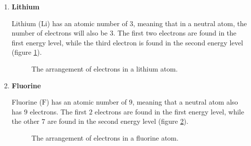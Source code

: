 \begin{enumerate}[noitemsep, label=\textbf{\arabic*}. ] 

\item{\textbf{Lithium} \\
\begin{minipage}{.4\textwidth}
Lithium ($\text{Li}$) has an atomic number of $3$, meaning that in a neutral atom, the number of electrons will also be $3$. The first two electrons are found in the first energy level, while the third electron is found in the second energy level (figure \ref{fig:atom:lithium}).
\end{minipage}
\begin{minipage}{.6\textwidth}
\begin{figure}[H]
\begin{center}
\caption{The arrangement of electrons in a lithium atom.}
\label{fig:atom:lithium}
\end{center}
\end{figure}
\end{minipage}
}

\item{\textbf{Fluorine} \\
\begin{minipage}{.4\textwidth}
Fluorine ($\text{F}$) has an atomic number of $9$, meaning that a neutral atom also has $9$ electrons. The first $2$ electrons are found in the first energy level, while the other $7$ are found in the second energy level (figure \ref{fig:atom:fluorine}).
\end{minipage}
\begin{minipage}{.6\textwidth}
\begin{figure}[H]
\begin{center}
\caption{The arrangement of electrons in a fluorine atom.}
\label{fig:atom:fluorine}
\end{center}
\end{figure}
\end{minipage}
}


\end{enumerate}
